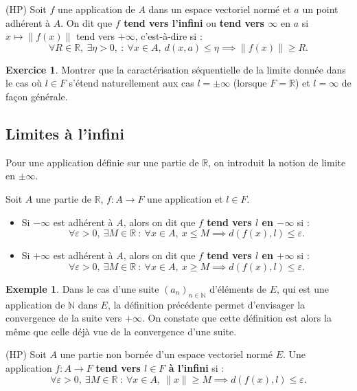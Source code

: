 \documentclass[french]{article}
\newcommand{\N}{\mathbb{N}}
\newcommand{\R}{\mathbb{R}}
\theoremstyle{plain}
\theoremstyle{definition}
\newtheorem*{ex}{Exemple}
\newtheorem{exo}{Exercice}
\theoremstyle{remark}
\begin{document}
\begin{dfn}{(HP)}
	Soit $f$ une application de $A$ dans un espace vectoriel normé et $a$ un point adhérent à $A$. On dit que \textbf{$f$ tend vers l'infini} ou \textbf{tend vers $\infty$} en $a$ si $x\mapsto\lVert f(x)\rVert$ tend vers $+\infty$, c'est-à-dire si : $$\forall R\in\R,\ \exists\eta>0,\ :\ \forall x\in A,\ d(x,a)\leqslant\eta\implies \lVert f(x)\rVert\geqslant R.$$
\end{dfn}

\begin{exo}
	Montrer que la caractérisation séquentielle de la limite donnée dans le cas où $l\in F$ s'étend naturellement aux cas $l=\pm\infty$ (lorsque $F=\R$) et $l=\infty$ de façon générale.
\end{exo}

\subsection{Limites à l'infini}

Pour une application définie sur une partie de $\R$, on introduit la notion de limite en $\pm\infty$.

\begin{dfn}
	Soit $A$ une partie de $\R$, $f:A\to F$ une application et $l\in F$.
	\begin{itemize}
		\item Si $-\infty$ est adhérent à $A$, alors on dit que \textbf{$f$ tend vers $l$ en $-\infty$} si :
		$$\forall\varepsilon>0,\ \exists M\in\R\ : \ \forall x\in A,\ x\leqslant M\implies d(f(x),l)\leqslant\varepsilon.$$
		\item Si $+\infty$ est adhérent à $A$, alors on dit que \textbf{$f$ tend vers $l$ en $+\infty$} si :
		$$\forall\varepsilon>0,\ \exists M\in\R\ : \ \forall x\in A,\ x\geqslant M\implies d(f(x),l)\leqslant\varepsilon.$$
	\end{itemize}
\end{dfn}

\begin{ex}
	Dans le cas d'une suite $(a_n)_{n\in\N}$ d'éléments de $E$, qui est une application de $\N$ dans $E$, la définition précédente permet d'envisager la convergence de la suite vers $+\infty$. On constate que cette définition est alors la même que celle déjà vue de la convergence d'une suite.
\end{ex}

\begin{dfn}{(HP)}
	Soit $A$ une partie non bornée d'un espace vectoriel normé $E$. Une application $f:A\to F$ \textbf{tend vers $l\in F$ à l'infini} si : $$\forall\varepsilon>0,\ \exists M\in\R\ :\ \forall x\in A,\ \lVert x\rVert\geqslant M\implies d(f(x),l)\leqslant\varepsilon.$$
\end{dfn}
\end{document}
